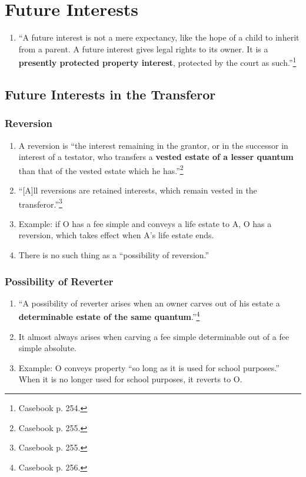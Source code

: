 \section{Future Interests}

\begin{enumerate}
    \item ``A future interest is not a mere expectancy, like the hope of a 
    child to inherit from a parent. A future interest gives legal rights to 
    its owner. It is a \textbf{presently protected property interest}, 
    protected by the court as such.''\footnote{Casebook p. 254.}
\end{enumerate}

\subsection{Future Interests in the Transferor}

\subsubsection{Reversion}

\begin{enumerate}
    \item A reversion is ``the interest remaining in the grantor, or in the 
    successor in interest of a testator, who transfers a \textbf{vested estate 
    of a lesser quantum} than that of the vested estate which he 
    has.''\footnote{Casebook p. 255.}
    \item ``[A]ll reversions are retained interests, which remain vested in 
    the transferor.''\footnote{Casebook p. 255.}
    \item Example: if O has a fee simple and conveys a life estate to A, O has 
    a reversion, which takes effect when A's life estate ends.
    \item There is no such thing as a ``possibility of reversion.''
\end{enumerate}

\subsubsection{Possibility of Reverter}

\begin{enumerate}
    \item ``A possibility of reverter arises when an owner carves out of his 
    estate a \textbf{determinable estate of the same 
    quantum}.''\footnote{Casebook p. 256.}
    \item It almost always arises when carving a fee simple determinable out 
    of a fee simple absolute.
    \item Example: O conveys property ``so long as it is used for school 
    purposes.'' When it is no longer used for school purposes, it reverts to 
    O.
\end{enumerate}

